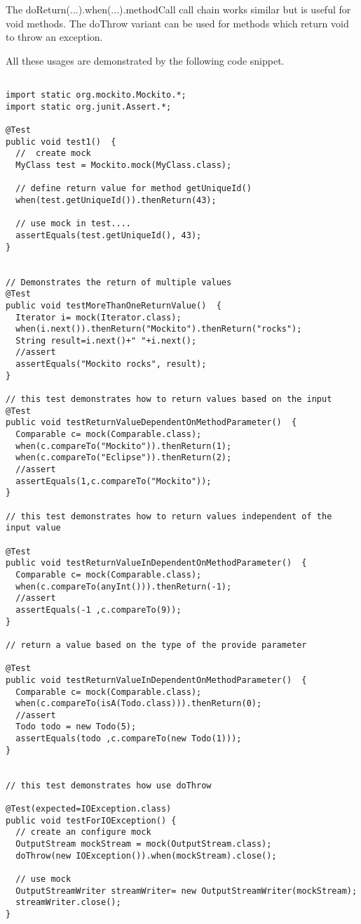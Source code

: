 \documentclass{article}
\begin{document}
The doReturn(...).when(...).methodCall call chain works similar but is
useful for void methods. The doThrow variant can be used for methods
which return void to throw an exception. 


All these usages are demonstrated by the following code snippet. 



\begin{lstlisting}

import static org.mockito.Mockito.*;
import static org.junit.Assert.*;

@Test
public void test1()  {
  //  create mock
  MyClass test = Mockito.mock(MyClass.class);
  
  // define return value for method getUniqueId()
  when(test.getUniqueId()).thenReturn(43);
  
  // use mock in test.... 
  assertEquals(test.getUniqueId(), 43);
}


// Demonstrates the return of multiple values
@Test
public void testMoreThanOneReturnValue()  {
  Iterator i= mock(Iterator.class);
  when(i.next()).thenReturn("Mockito").thenReturn("rocks");
  String result=i.next()+" "+i.next();
  //assert
  assertEquals("Mockito rocks", result);
}

// this test demonstrates how to return values based on the input
@Test
public void testReturnValueDependentOnMethodParameter()  {
  Comparable c= mock(Comparable.class);
  when(c.compareTo("Mockito")).thenReturn(1);
  when(c.compareTo("Eclipse")).thenReturn(2);
  //assert
  assertEquals(1,c.compareTo("Mockito"));
}

// this test demonstrates how to return values independent of the input value

@Test
public void testReturnValueInDependentOnMethodParameter()  {
  Comparable c= mock(Comparable.class);
  when(c.compareTo(anyInt())).thenReturn(-1);
  //assert
  assertEquals(-1 ,c.compareTo(9));
}

// return a value based on the type of the provide parameter

@Test
public void testReturnValueInDependentOnMethodParameter()  {
  Comparable c= mock(Comparable.class);
  when(c.compareTo(isA(Todo.class))).thenReturn(0);
  //assert
  Todo todo = new Todo(5);
  assertEquals(todo ,c.compareTo(new Todo(1)));
} 


// this test demonstrates how use doThrow

@Test(expected=IOException.class)
public void testForIOException() {
  // create an configure mock
  OutputStream mockStream = mock(OutputStream.class);
  doThrow(new IOException()).when(mockStream).close();
  
  // use mock
  OutputStreamWriter streamWriter= new OutputStreamWriter(mockStream);
  streamWriter.close();
} 

\end{lstlisting}
\end{document}
